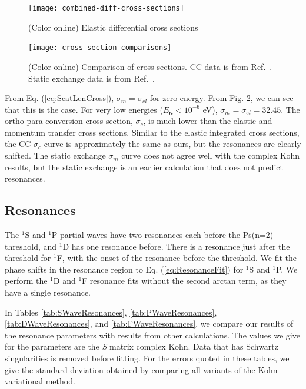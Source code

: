 \documentclass[preprint,showpacs,preprintnumbers,amsmath,amssymb,longbibliography,pra,aps]{revtex4-1}
\begin{document}
\begin{figure}[H]
	\centering
	\texttt{[image: combined-diff-cross-sections]}
	\caption{(Color online) Elastic differential cross sections}
	\label{fig:combined-diff-cross-sections}
\end{figure}

\begin{figure}[H]
	\centering
	\texttt{[image: cross-section-comparisons]}
	\caption{(Color online) Comparison of cross sections. CC data is from Ref.~\cite{Blackwood2002}. Static exchange data is from Ref.~\cite{Hara1975}.}
	\label{fig:cross-section-comparisons}
\end{figure}

From Eq. (\ref{eq:ScatLenCross}), $\sigma_m = \sigma_{el}$ for zero energy. From Fig. \ref{fig:cross-section-comparisons}, we can see that this is the case. For very low energies ($E_{\bm \kappa} < 10^{-6}$ eV), $\sigma_m = \sigma_{el} = 32.45$. The ortho-para conversion cross section, $\sigma_c$, is much lower than the elastic and momentum transfer cross sections. Similar to the elastic integrated cross sections, the CC $\sigma_c$ curve is approximately the same as ours, but the resonances are clearly shifted. The static exchange $\sigma_m$ curve does not agree well with the complex Kohn results, but the static exchange is an earlier calculation that does not predict resonances.

\subsection{Resonances}
\label{sec:Resonances}
The $^1$S and $^1$P partial waves have two resonances each before the Ps(n=2) threshold, and $^1$D has one resonance before. There is a resonance just after the threshold for $^1$F, with the onset of the resonance before the threshold. We fit the phase shifts in the resonance region to Eq. (\ref{eq:ResonanceFit}) for $^1$S and $^1$P. We perform the $^1$D and $^1$F resonance fits without the second arctan term, as they have a single resonance.

In Tables \ref{tab:SWaveResonances}, \ref{tab:PWaveResonances}, \ref{tab:DWaveResonances}, and \ref{tab:FWaveResonances}, we compare our results of the resonance parameters with results from other calculations. The values we give for the parameters are the \emph{S} matrix complex Kohn. Data that has Schwartz singularities is removed before fitting. For the errors quoted in these tables, we give the standard deviation obtained by comparing all variants of the Kohn variational method.
\end{document}

